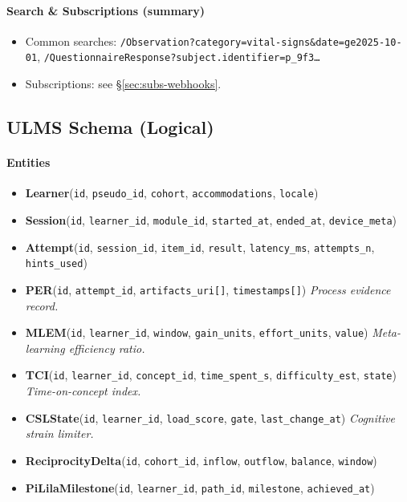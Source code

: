 \documentclass[11pt]{article}
\theoremstyle{plain}
\begin{document}
\paragraph{Search \& Subscriptions (summary)}
\begin{itemize}
  \item Common searches: \texttt{/Observation?category=vital-signs\&date=ge2025-10-01}, \texttt{/QuestionnaireResponse?subject.identifier=p\_9f3…}
  \item Subscriptions: see \S\ref{sec:subs-webhooks}.
\end{itemize}

\bigskip
\subsection{ULMS Schema (Logical)}\label{sec:ulms-schema}

\paragraph{Entities}
\begin{itemize}
  \item \textbf{Learner}(\texttt{id}, \texttt{pseudo\_id}, \texttt{cohort}, \texttt{accommodations}, \texttt{locale})
  \item \textbf{Session}(\texttt{id}, \texttt{learner\_id}, \texttt{module\_id}, \texttt{started\_at}, \texttt{ended\_at}, \texttt{device\_meta})
  \item \textbf{Attempt}(\texttt{id}, \texttt{session\_id}, \texttt{item\_id}, \texttt{result}, \texttt{latency\_ms}, \texttt{attempts\_n}, \texttt{hints\_used})
  \item \textbf{PER}(\texttt{id}, \texttt{attempt\_id}, \texttt{artifacts\_uri[]}, \texttt{timestamps[]}) \emph{Process evidence record.}
  \item \textbf{MLEM}(\texttt{id}, \texttt{learner\_id}, \texttt{window}, \texttt{gain\_units}, \texttt{effort\_units}, \texttt{value}) \emph{Meta-learning efficiency ratio.}
  \item \textbf{TCI}(\texttt{id}, \texttt{learner\_id}, \texttt{concept\_id}, \texttt{time\_spent\_s}, \texttt{difficulty\_est}, \texttt{state}) \emph{Time-on-concept index.}
  \item \textbf{CSLState}(\texttt{id}, \texttt{learner\_id}, \texttt{load\_score}, \texttt{gate}, \texttt{last\_change\_at}) \emph{Cognitive strain limiter.}
  \item \textbf{ReciprocityDelta}(\texttt{id}, \texttt{cohort\_id}, \texttt{inflow}, \texttt{outflow}, \texttt{balance}, \texttt{window})
  \item \textbf{PiLilaMilestone}(\texttt{id}, \texttt{learner\_id}, \texttt{path\_id}, \texttt{milestone}, \texttt{achieved\_at})
\end{itemize}
\end{document}
